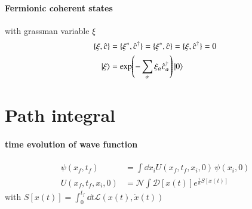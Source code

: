 \paragraph{Fermionic coherent states}
with grassman variable $\xi$
\begin{align}
	\{\xi, \hat{c}\} &= \{\xi^*, \hat{c}^\dagger\} = \{\xi^*, \hat{c}\} = \{\xi, \hat{c}^\dagger\} = 0 \\
	\ket{\xi} &= \exp(-\sum_\alpha \xi_\alpha \hat{c}_\alpha^\dagger) \ket{0}
\end{align}

\section{Path integral}
\paragraph{time evolution of wave function}
\begin{align}
	\psi(x_f,t_f) &= \int \dd x_i U(x_f,t_f,x_i,0) \, \psi(x_i, 0) \\
	U(x_f, t_f, x_i, 0) &= \mathcal{N} \int \mathcal{D}[x(t)] e^{\frac{i}{\hbar}S[x(t)]}
\end{align}
with $S[x(t)] = \int^{t_f}_0 \dd t \mathcal{L}(x(t), \dot{x}(t))$

